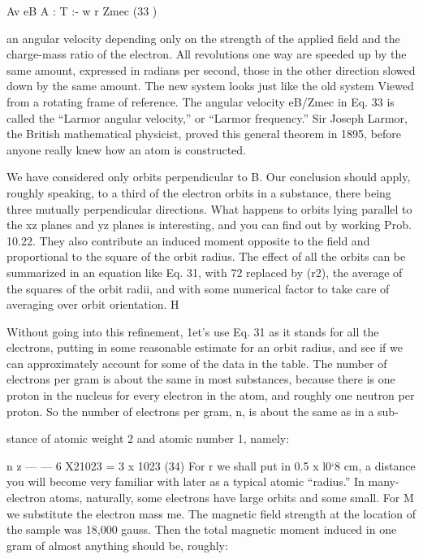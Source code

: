 {Av eB
A : T :-
w r Zmec (33 )

an angular velocity depending only on the strength of the applied
field and the charge-mass ratio of the electron. All revolutions one
way are speeded up by the same amount, expressed in radians per
second, those in the other direction slowed down by the same
amount. The new system looks just like the old system Viewed from
a rotating frame of reference. The angular velocity eB/Zmec in Eq. 33
is called the ``Larmor angular velocity,'' or ``Larmor frequency.''
Sir Joseph Larmor, the British mathematical physicist, proved this
general theorem in 1895, before anyone really knew how an atom
is constructed.

We have considered only orbits perpendicular to B. Our conclusion
should apply, roughly speaking, to a third of the electron
orbits in a substance, there being three mutually perpendicular
directions. What happens to orbits lying parallel to the xz planes
and yz planes is interesting, and you can find out by working
Prob. 10.22. They also contribute an induced moment opposite to
the field and proportional to the square of the orbit radius. The
effect of all the orbits can be summarized in an equation like Eq. 31,
with 72 replaced by (r2), the average of the squares of the orbit radii,
and with some numerical factor to take care of averaging over orbit
orientation. H

Without going into this refinement, 1et's use Eq. 31 as it stands
for all the electrons, putting in some reasonable estimate for an orbit
radius, and see if we can approximately account for some of the data
in the table. The number of electrons per gram is about the same
in most substances, because there is one proton in the nucleus for
every electron in the atom, and roughly one neutron per proton. So
the number of electrons per gram, n, is about the same as in a sub-

stance of atomic weight 2 and atomic number 1, namely:
\begin{equation}
\end{equation}

n z  ---  --- 6 X21023 = 3 x 1023 (34)
For r we shall put in 0.5 x l0‘8 cm, a distance you will become very
familiar with later as a typical atomic ``radius.'' In many-electron
atoms, naturally, some electrons have large orbits and some small.
For M we substitute the electron mass me. The magnetic field
strength at the location of the sample was 18,000 gauss. Then the
total magnetic moment induced in one gram of almost anything
should be, roughly:
\begin{equation}
\end{equation}

}
